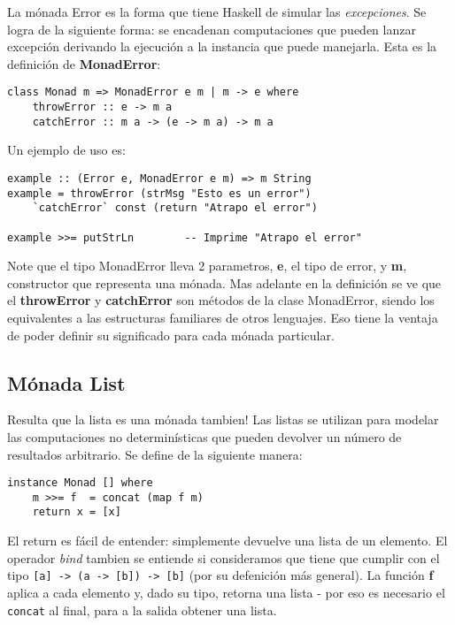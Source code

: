 La mónada Error es la forma que tiene Haskell de simular las
\textit{excepciones}. Se logra de la siguiente forma: se encadenan
computaciones que pueden lanzar excepción derivando la ejecución a la
instancia que puede manejarla. Esta es la definición de \textbf{MonadError}:

\begin{lstlisting}
class Monad m => MonadError e m | m -> e where
    throwError :: e -> m a
    catchError :: m a -> (e -> m a) -> m a
\end{lstlisting}

Un ejemplo de uso es:

\begin{lstlisting}
example :: (Error e, MonadError e m) => m String
example = throwError (strMsg "Esto es un error")
    `catchError` const (return "Atrapo el error")

example >>= putStrLn        -- Imprime "Atrapo el error"
\end{lstlisting}

Note que el tipo MonadError lleva 2 parametros, \textbf{e}, el tipo de error, y \textbf{m}, constructor que representa una mónada. Mas adelante en la definición se ve que el \textbf{throwError} y \textbf{catchError} son métodos de la clase MonadError, siendo los equivalentes a las estructuras familiares de otros lenguajes. Eso tiene la ventaja de poder definir su significado para cada mónada particular.





\subsection{Mónada List} %
\label{sub:m_nada_list}


Resulta que la lista es una mónada tambien! Las listas se utilizan para modelar
las computaciones no determinísticas que pueden devolver un número de
resultados arbitrario. Se define de la siguiente manera:

\begin{lstlisting}
instance Monad [] where
    m >>= f  = concat (map f m)
    return x = [x]
\end{lstlisting}

El return es fácil de entender: simplemente devuelve una lista de un elemento.
El operador \textit{bind} tambien se entiende si consideramos que tiene que
cumplir con el tipo \lstinline$[a] -> (a -> [b]) -> [b]$ (por su defenición
más general). La función \textbf{f} aplica a cada elemento y, dado su tipo,
retorna una lista - por eso es necesario el \lstinline$concat$ al final, para
a la salida obtener una lista.

